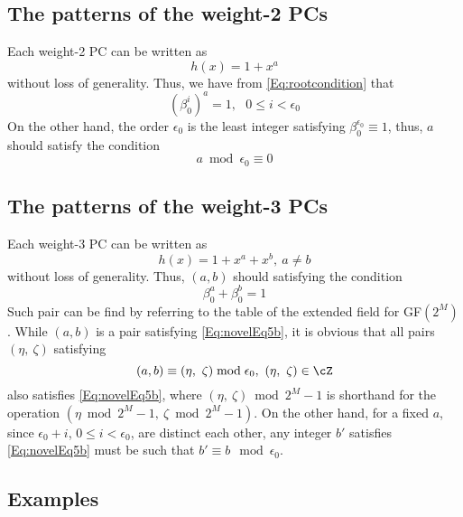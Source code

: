 \subsection{The patterns of the weight-2 PCs}
\label{sec:PC2}
Each weight-2 PC can be written as 
\begin{equation}
h(x)=1+x^a
\label{eq:wt2-gen-form}
\end{equation}
without loss of generality. Thus, we have from \eqref{Eq:rootcondition} that
\begin{equation}
(\beta_0^i)^a =1,~~~ 0 \leq i < \epsilon_0
\label{novelEq5b}
\end{equation}
On the other hand, the order $\epsilon_0$ is the least integer satisfying $\beta_0^{\epsilon_0} \equiv 1$, thus, $a$ should satisfy the condition
$$a \bmod \epsilon_0  \equiv 0$$

\subsection{The patterns of the weight-3 PCs}

Each weight-3 PC can be written as 
\begin{equation}
h(x)=1+x^a+x^b,~a\neq b
\label{novelEqwt3}
\end{equation}
without loss of generality. 
Thus, $(a,b)$ should satisfying the condition
\begin{equation}
\beta_0^a+\beta_0^b= 1
\label{Eq:novelEq5b}
\end{equation}
Such pair can be find by referring to the table of the extended field for GF$(2^M)$. 
While $(a,b)$ is a pair satisfying \eqref{Eq:novelEq5b}, it is obvious that all pairs $(\eta,~\zeta)$ satisfying
\begin{equation}
(a,b) \equiv (\eta,~\zeta) \bmod \epsilon_0,~(\eta,~\zeta)\in \cZ
\end{equation}
also satisfies \eqref{Eq:novelEq5b}, where $(\eta,~\zeta) \bmod 2^M-1$ is shorthand for the operation $(\eta \bmod 2^M-1,~\zeta \bmod 2^M-1)$. On the other hand, for a fixed $a$, since $\epsilon_0+i$, $0 \leq i < \epsilon_0$, are distinct each other, any integer $b'$ satisfies \eqref{Eq:novelEq5b} must be such that $b'\equiv b \mod \epsilon_0$.

\subsection{Examples}

